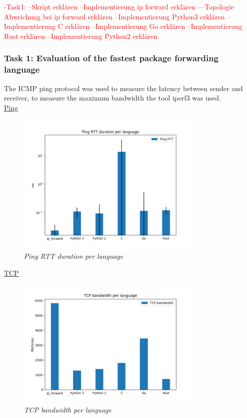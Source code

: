 \textcolor{red}{-Task1:
--Skript erklären
--Implementierung ip forward erklären
---Topologie Abweichung bei ip forward erklären
--Implementierung Python3 erklären
--Implementierung C erklären
--Implementierung Go erklären
--Implementierung Rust erklären
--Implementierung Python2 erklären}


\subsubsection{Task 1: Evaluation of the fastest package forwarding language}
The ICMP ping protocol was used to measure the latency between sender and receiver, to measure the maximum bandwidth the tool iperf3 was used.\\
\underline{Ping}\\
\begin{figure}[h]
\centering
\includegraphics*[width=9cm]{ping}
\caption{\em Ping RTT duration per language}
\label{fig:ping}
\end{figure}


\underline{TCP}\\
\begin{figure}[h]
\centering
\includegraphics*[width=9cm]{tcp}
\caption{\em TCP bandwidth per language}
\label{fig:tcp}
\end{figure}

